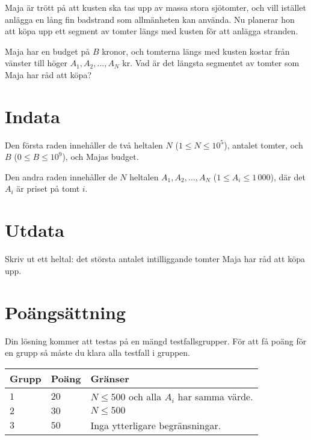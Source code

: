 Maja är trött på att kusten ska tas upp av massa stora sjötomter, och vill istället anlägga en lång fin badstrand som allmänheten kan använda.
Nu planerar hon att köpa upp ett segment av tomter längs med kusten för att anlägga stranden.

Maja har en budget på $B$ kronor, och tomterna längs med kusten kostar från vänster till höger $A_1,A_2,\dots,A_N$ kr.
Vad är det längsta segmentet av tomter som Maja har råd att köpa?

\section*{Indata}
Den första raden innehåller de två heltalen $N$ ($1\leq N \leq 10^5$), antalet tomter, och $B$ ($0 \leq B \leq 10^9$), och Majas budget.

Den andra raden innehåller de $N$ heltalen $A_1,A_2, \dots, A_N$ ($1 \le A_i \le 1\,000$), där det $A_i$ är priset på tomt $i$.

\section*{Utdata}
Skriv ut ett heltal: det största antalet intilliggande tomter Maja har råd att köpa upp.

\section*{Poängsättning}
Din lösning kommer att testas på en mängd testfallsgrupper.
För att få poäng för en grupp så måste du klara alla testfall i gruppen.

\noindent
\begin{tabular}{| l | l | p{12cm} |}
  \hline
  \textbf{Grupp} & \textbf{Poäng} & \textbf{Gränser} \\ \hline
  $1$   & $20$       & $N \leq 500 $ och alla $A_i$ har samma värde.\\ \hline
  $2$   & $30$       & $N \leq 500 $\\ \hline
  $3$   & $50$       & Inga ytterligare begränsningar. \\ \hline
\end{tabular}
